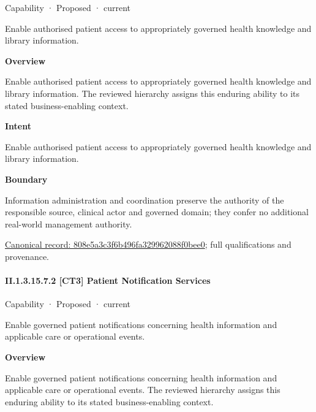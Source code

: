 \label{element:808e5a3c3f6b496fa329962088f0bee0}
{\small Capability · Proposed · current}\par

Enable authorised patient access to appropriately governed health knowledge and library information.



\textbf{Overview}



Enable authorised patient access to appropriately governed health knowledge and library information. The reviewed hierarchy assigns this enduring ability to its stated business-enabling context.



\textbf{Intent}



Enable authorised patient access to appropriately governed health knowledge and library information.



\textbf{Boundary}



Information administration and coordination preserve the authority of the responsible source, clinical actor and governed domain; they confer no additional real-world management authority.


{\footnotesize \href{../../../../continuum/strategy/capability/808e5a3c3f6b496fa329962088f0bee0.md}{Canonical record: 808e5a3c3f6b496fa329962088f0bee0}; full qualifications and provenance.}\par
\paragraph*{II.1.3.15.7.2 [CT3] Patient Notification Services}
\label{navigation:II.1.3.15.7.2}

\label{element:9d172cd511b742499c4e7c23f6630a35}
{\small Capability · Proposed · current}\par

Enable governed patient notifications concerning health information and applicable care or operational events.



\textbf{Overview}



Enable governed patient notifications concerning health information and applicable care or operational events. The reviewed hierarchy assigns this enduring ability to its stated business-enabling context.




